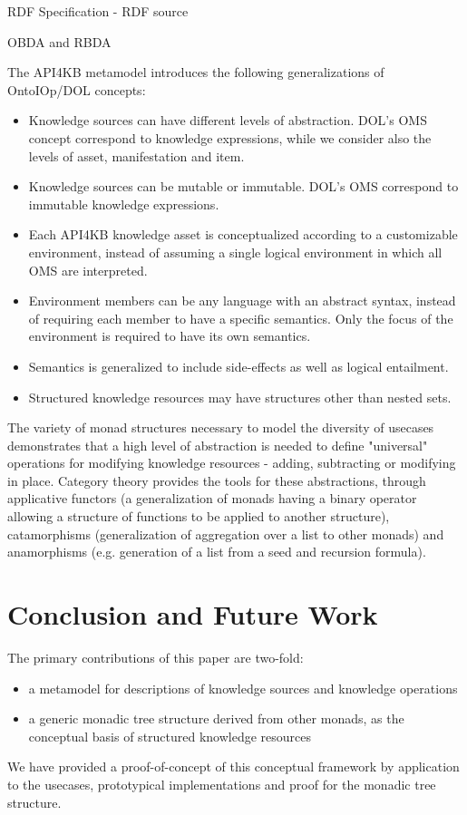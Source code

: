 \documentclass[runningheads]{llncs}
\begin{document}
RDF Specification - RDF source

OBDA and RBDA

The API4KB metamodel introduces the following generalizations of OntoIOp/DOL concepts:
\begin{itemize}
\item Knowledge sources can have different levels of abstraction. DOL's OMS concept correspond to knowledge expressions, while we consider also the levels of asset, manifestation and item.
\item Knowledge sources can be mutable or immutable. DOL's OMS correspond to immutable knowledge expressions.
\item Each API4KB knowledge asset is conceptualized according to a customizable environment, instead of assuming a single logical environment in which all OMS are interpreted.
\item Environment members can be any language with an abstract syntax, instead of requiring each member to have a specific semantics. Only the focus of the environment is required to have its own semantics.
\item Semantics is generalized to include side-effects as well as logical entailment.
\item Structured knowledge resources may have structures other than nested sets.
\end{itemize}

The variety of monad structures necessary to model the diversity of usecases demonstrates that a high level of abstraction is needed to define "universal" operations for modifying knowledge resources - adding, subtracting or modifying in place. Category theory provides the tools for these abstractions, through applicative functors (a generalization of monads having a binary operator allowing a structure of functions to be applied to another structure), catamorphisms (generalization of aggregation over a list to other monads) and anamorphisms (e.g. generation of a list from a seed and recursion formula).

\section{Conclusion and Future Work}
\label{conc}
The primary contributions of this paper are two-fold:
\begin{itemize}
\item a metamodel for descriptions of knowledge sources and knowledge operations
\item a generic monadic tree structure derived from other monads, as the conceptual basis of structured knowledge resources
\end{itemize}
We have provided a proof-of-concept of this conceptual framework by application to the usecases, prototypical implementations and proof for the monadic tree structure.
\end{document}
